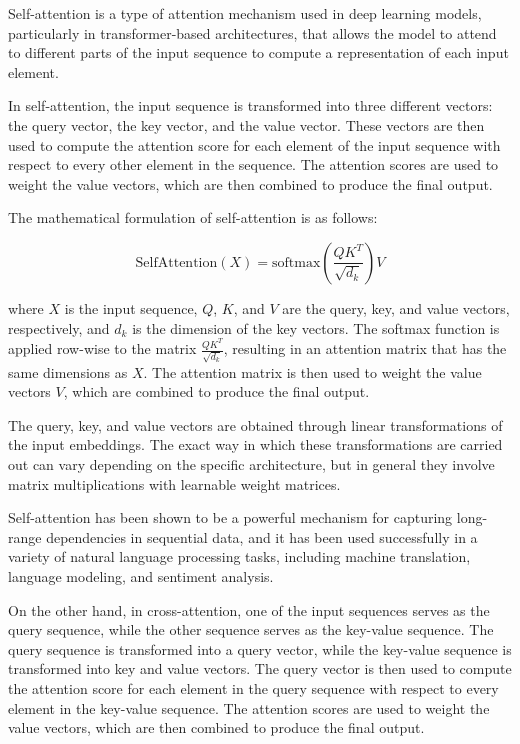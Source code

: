 Self-attention is a type of attention mechanism used in deep learning models, particularly in transformer-based architectures, that allows the model to attend to different parts of the input sequence to compute a representation of each input element.

In self-attention, the input sequence is transformed into three different vectors: the query vector, the key vector, and the value vector. These vectors are then used to compute the attention score for each element of the input sequence with respect to every other element in the sequence. The attention scores are used to weight the value vectors, which are then combined to produce the final output.

The mathematical formulation of self-attention is as follows:

\begin{equation}
	\text{SelfAttention}(X) = \text{softmax}\left(\frac{QK^T}{\sqrt{d_k}}\right)V
\end{equation}

where $X$ is the input sequence, $Q$, $K$, and $V$ are the query, key, and value vectors, respectively, and $d_k$ is the dimension of the key vectors. The softmax function is applied row-wise to the matrix $\frac{QK^T}{\sqrt{d_k}}$, resulting in an attention matrix that has the same dimensions as $X$. The attention matrix is then used to weight the value vectors $V$, which are combined to produce the final output.

The query, key, and value vectors are obtained through linear transformations of the input embeddings. The exact way in which these transformations are carried out can vary depending on the specific architecture, but in general they involve matrix multiplications with learnable weight matrices.

Self-attention has been shown to be a powerful mechanism for capturing long-range dependencies in sequential data, and it has been used successfully in a variety of natural language processing tasks, including machine translation, language modeling, and sentiment analysis.

On the other hand, in cross-attention, one of the input sequences serves as the query sequence, while the other sequence serves as the key-value sequence. The query sequence is transformed into a query vector, while the key-value sequence is transformed into key and value vectors. The query vector is then used to compute the attention score for each element in the query sequence with respect to every element in the key-value sequence. The attention scores are used to weight the value vectors, which are then combined to produce the final output.

